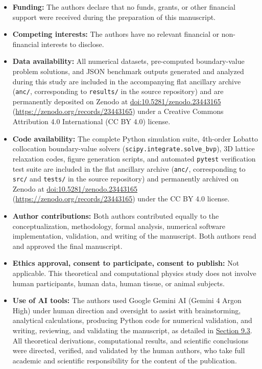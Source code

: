 \documentclass[10pt,aps,prd,twocolumn,superscriptaddress,nofootinbib,floatfix,longbibliography,showkeys]{revtex4-2}
\begin{document}
\begin{itemize}
  \item \textbf{Funding:} The authors declare that no funds, grants, or other financial support were received during the preparation of this manuscript.
  \item \textbf{Competing interests:} The authors have no relevant financial or non-financial interests to disclose.
  \item \textbf{Data availability:} All numerical datasets, pre-computed boundary-value problem solutions, and JSON benchmark outputs generated and analyzed during this study are included in the accompanying flat ancillary archive (\texttt{anc/}, corresponding to \texttt{results/} in the source repository) and are permanently deposited on Zenodo at \href{https://doi.org/10.5281/zenodo.23443165}{doi:10.5281/zenodo.23443165} (\href{https://zenodo.org/records/23443165}{https://zenodo.org/records/23443165}) under a Creative Commons Attribution 4.0 International (CC BY 4.0) license.
  \item \textbf{Code availability:} The complete Python simulation suite, 4th-order Lobatto collocation boundary-value solvers (\texttt{scipy.integrate.solve\_bvp}), 3D lattice relaxation codes, figure generation scripts, and automated \texttt{pytest} verification test suite are included in the flat ancillary archive (\texttt{anc/}, corresponding to \texttt{src/} and \texttt{tests/} in the source repository) and permanently archived on Zenodo at \href{https://doi.org/10.5281/zenodo.23443165}{doi:10.5281/zenodo.23443165} (\href{https://zenodo.org/records/23443165}{https://zenodo.org/records/23443165}) under the CC BY 4.0 license.
  \item \textbf{Author contributions:} Both authors contributed equally to the conceptualization, methodology, formal analysis, numerical software implementation, validation, and writing of the manuscript. Both authors read and approved the final manuscript.
  \item \textbf{Ethics approval, consent to participate, consent to publish:} Not applicable. This theoretical and computational physics study does not involve human participants, human data, human tissue, or animal subjects.
  \item \textbf{Use of AI tools:} The authors used Google Gemini AI (Gemini 4 Argon High) under human direction and oversight to assist with brainstorming, analytical calculations, producing Python code for numerical validation, and writing, reviewing, and validating the manuscript, as detailed in \hyperref[sec:9.3]{Section 9.3}. All theoretical derivations, computational results, and scientific conclusions were directed, verified, and validated by the human authors, who take full academic and scientific responsibility for the content of the publication.
\end{itemize}
\end{document}
